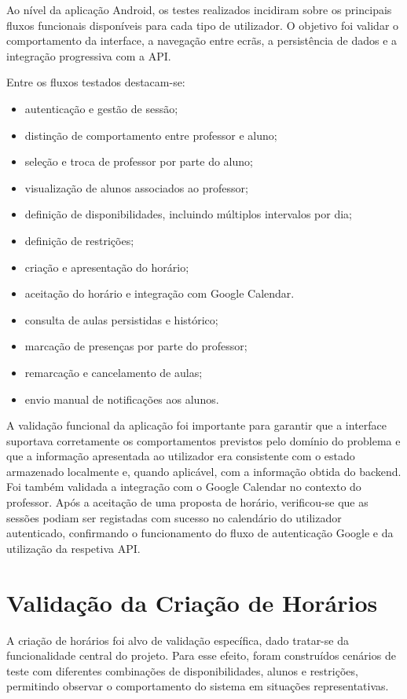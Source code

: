 Ao nível da aplicação Android, os testes realizados incidiram sobre os principais fluxos funcionais disponíveis para cada tipo de utilizador.
O objetivo foi validar o comportamento da interface, a navegação entre ecrãs, a persistência de dados e a integração progressiva com a API.

Entre os fluxos testados destacam-se:
\begin{itemize}
    \item autenticação e gestão de sessão;
    \item distinção de comportamento entre professor e aluno;
    \item seleção e troca de professor por parte do aluno;
    \item visualização de alunos associados ao professor;
    \item definição de disponibilidades, incluindo múltiplos intervalos por dia;
    \item definição de restrições;
    \item criação e apresentação do horário;
    \item aceitação do horário e integração com Google Calendar.
    \item consulta de aulas persistidas e histórico;
    \item marcação de presenças por parte do professor;
    \item remarcação e cancelamento de aulas;
    \item envio manual de notificações aos alunos.
\end{itemize}

A validação funcional da aplicação foi importante para garantir que a interface suportava corretamente os comportamentos previstos pelo domínio
do problema e que a informação apresentada ao utilizador era consistente com o estado armazenado localmente e, quando aplicável, com a informação obtida do backend.
Foi também validada a integração com o Google Calendar no contexto do professor.
Após a aceitação de uma proposta de horário, verificou-se que as sessões podiam ser registadas com sucesso no calendário do utilizador autenticado, confirmando o funcionamento do fluxo de autenticação Google e da utilização da respetiva API.

\section{Validação da Criação de Horários}

A criação de horários foi alvo de validação específica, dado tratar-se da funcionalidade central do projeto.
Para esse efeito, foram construídos cenários de teste com diferentes combinações de disponibilidades, alunos e restrições,
permitindo observar o comportamento do sistema em situações representativas.

